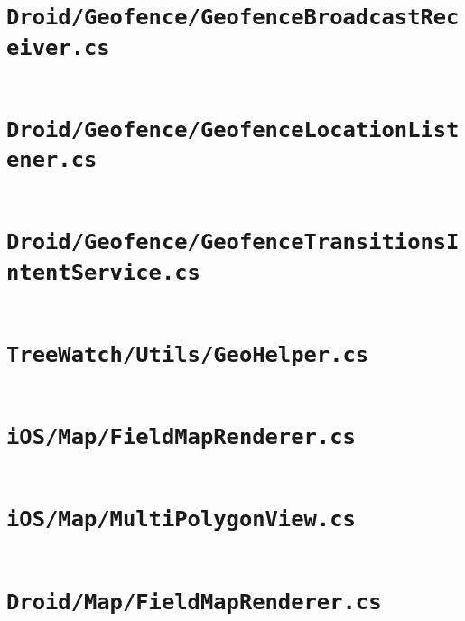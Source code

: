 \documentclass[12pt]{article}
\begin{document}
\section{\texttt{Droid/Geofence/GeofenceBroadcastReceiver.cs}}
	\inputminted[linenos,firstline=22]{csharp}{../../../src/Droid/Geofence/GeofenceBroadcastReceiver.cs}
	\pagebreak

\section{\texttt{Droid/Geofence/GeofenceLocationListener.cs}}
	\inputminted[linenos,firstline=22]{csharp}{../../../src/Droid/Geofence/GeofenceLocationListener.cs}
	\pagebreak

\section[\texttt{Droid/Geofence/GeofenceTransitionsIntentService.cs}]
{\texttt{Droid/Geofence/\linebreak GeofenceTransitionsIntentService.cs}}
	\inputminted[linenos,firstline=22]{csharp}{../../../src/Droid/Geofence/GeofenceTransitionsIntentService.cs}
	\pagebreak

\section{\texttt{TreeWatch/Utils/GeoHelper.cs}}
	\inputminted[linenos,firstline=22]{csharp}{../../../src/TreeWatch/Utils/GeoHelper.cs}
	\pagebreak

\section{\texttt{iOS/Map/FieldMapRenderer.cs}}
	\inputminted[linenos,firstline=22]{csharp}{../../../src/iOS/Map/FieldMapRenderer.cs}
	\pagebreak

\section{\texttt{iOS/Map/MultiPolygonView.cs}}
	\inputminted[linenos,firstline=22]{csharp}{../../../src/iOS/Map/MultiPolygonView.cs}
	\pagebreak

\section{\texttt{Droid/Map/FieldMapRenderer.cs}}
	\inputminted[linenos,firstline=22]{csharp}{../../../src/Droid/Map/FieldMapRenderer.cs}
	\pagebreak
\end{document}
